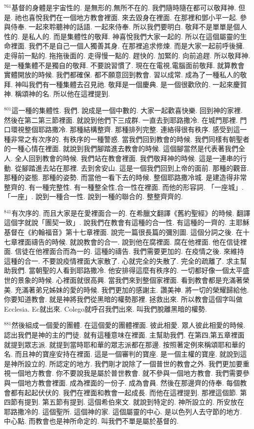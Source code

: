 \documentclass{book}
\begin{document}
$^{761}$基督的身體是宇宙性的.
是無形的,無所不在的.
我們隨時隨在都可以敬拜神.
但是.
祂也喜悅我們在一個地方教會裡面.
來去毀身在裡面.
在那裡和鄧小平一起.
參與侍奉.
一起來聆聽神的話語.
一起來侍奉.
所以我們要明白.
敬拜不是單單是個人性的.
是私人的.
而是集體性的敬拜.
神喜悅我們大家一起的.
所以在這個屬靈的生命裡面.
我們不是自己一個人獨善其身.
在那裡追求修煉.
而是大家一起前呼後擁.
走得前一點的.
拖拖後面的.
走得慢一點的.
趕快的.
加緊的.
向前追趕.
所以敬拜神.
是一種集體不是獨自的敬拜.
不要說習慣了.
現在在電視,電腦面前敬拜.
就算教會實體開放的時候.
我們都確保.
都不願意回到教會.
習以成常.
成為了一種私人的敬拜.
神叫我們有一種集體去召見祂.
敬拜是一個慶典.
是一個很歡欣的.
一起來慶賀神.
稱頌神的名.
所以他在這裡提到.

$^{801}$這一種的集體性.
我們.
說成是一個中數的.
大家一起歡喜快樂.
回到神的家裡.
然後在第二第三節裡面.
就說到他們下三成群.
一直去到耶路撒冷.
在城門那裡.
門口環視整個耶路撒冷.
那種結構整齊.
那種排列完整.
連絡得很有秩序.
感受到這一種非常之有次序的.
有秩序的一種警惑.
當我們回到教會的時候.
我們同樣有朝聖者的一種心情在裡面.
就說到我們腳踏進去教會的時候.
這個腳當然是代表著我們全人.
全人回到教會的時候.
我們站在教會裡面.
我們敬拜神的時候.
這是一連串的行動.
從腳踏進去站在那裡.
去到舍安山.
這是一個我們回到上帝的面前.
那種的觀音.
那種的姿態.
那種的姿勢.
而當他一看下去的時候.
整個耶路撒冷城.
是建造得非常整齊的.
有一種完整性.
有一種整全性,合一性在裡面.
而他的形容詞.
「一座城」.
「一座」.
說到一種合一性.
說到一種的聯合的.
整整齊齊的.

$^{841}$有次序的.
而且大家是在愛裡面合一的.
在希臘文翻譯《舊約聖經》的時候.
翻譯這個字就說「團契一致」.
說我們在教會有這種的合一性.
有這種的一齊的.
主耶穌基督在《約翰福音》第十七章裡面.
說完一篇很長篇的彌別圖.
這個分詞之後.
在十七章裡面禱告的時候.
就說教會的合一.
說到他在腐裡面.
腐在他裡面.
他在信徒裡面.
信徒在他裡面合而為一的.
這種的禱告.
我們需要更加的.
在疫情之後.
來維持這種的合一.
不要說疫情裡面大家散了.
心就完全的失散了.
完全的疏離了.
求主幫助我們.
當朝聖的人看到耶路撒冷.
他安排得這麼有秩序的.
一切都好像一個太平盛世的景象的時候.
心裡面就很高興.
當我們來到整個家裡面.
看到教會都是充滿著榮美.
充滿著弟兄姊妹的愛的時候.
我們更加的感謝主.
讚美神.
將一切的榮耀歸給他.
你要知道教會.
就是神將我們從黑暗的權勢那裡.
拯救出來.
所以教會這個字叫做Ecclesia.
Ec就出來.
Colego就呼召我們出來.
叫我們脫離黑暗的權勢.

$^{881}$然後組成一個愛的團體.
在這個愛的團體裡面.
彼此相愛.
眾人彼此相愛的時候.
認出我們是神的主的門徒.
就有這種意味在裡面.
主幫助我們.
在第四,第五章裡面就提到眾志派.
就提到當時耶和華的眾志派都在那邊.
按照著定例來稱頌耶和華的名.
而且神的寶座安持在裡面.
這是一個審判的寶座.
是一個主權的寶座.
就說到這是神所設立的.
所認定的地方.
我們剛才說除了一個普世的教會之外.
我們更加要重視一個地方教會.
你不要說我是屬於普世教會.
就不參與一個地方教會.
我們需要參與一個地方教會裡面.
成為裡面的一份子.
成為會員.
然後在那邊齊的侍奉.
每個教會都有起起伏伏的.
我們在裡面和教會一起成長.
而他在這裡提到.
那裡這個節.
第四節有提到.
第五節有提到.
這個希伯來文.
就說到特定的.
神所設立的.
所安放在耶路撒冷的.
這個聖所.
這個神的家.
這個屬靈的中心.
是以色列人去守節的地方.
中心點.
而教會也是神所命定的.
叫我們不單是屬於基督的.
\end{document}

